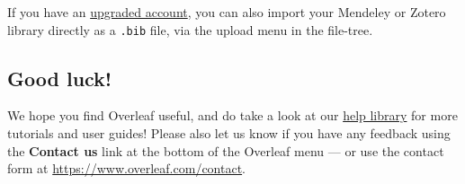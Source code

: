 \documentclass{article}
\begin{document}
      If you have an \href{https://www.overleaf.com/user/subscription/plans}{upgraded
      account}, you can also import your Mendeley or Zotero library directly as
      a \verb|.bib| file, via the upload menu in the file-tree.

      \subsection{Good luck!}

      We hope you find Overleaf useful, and do take a look at our \href{https://www.overleaf.com/learn}{help
      library} for more tutorials and user guides! Please also let us know if
      you have any feedback using the \textbf{Contact us} link at the bottom of the
      Overleaf menu --- or use the contact form at \url{https://www.overleaf.com/contact}.

      
      
\end{document}
